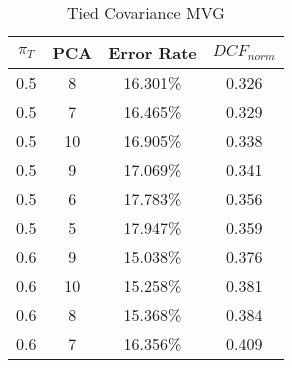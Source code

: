 \begin{center}
\begin{longtable}{|c|c|c|c|}
\caption{Tied Covariance MVG}\label{tab:mvg_tiedcov}\\
\hline
$\pi_T$ & PCA & Error Rate & $DCF_{norm}$\\
\hline
0.5 & 8 & 16.301\% & 0.326\\
\hline
0.5 & 7 & 16.465\% & 0.329\\
\hline
0.5 & 10 & 16.905\% & 0.338\\
\hline
0.5 & 9 & 17.069\% & 0.341\\
\hline
0.5 & 6 & 17.783\% & 0.356\\
\hline
0.5 & 5 & 17.947\% & 0.359\\
\hline
0.6 & 9 & 15.038\% & 0.376\\
\hline
0.6 & 10 & 15.258\% & 0.381\\
\hline
0.6 & 8 & 15.368\% & 0.384\\
\hline
0.6 & 7 & 16.356\% & 0.409\\
\hline
\hline
\end{longtable}
\end{center}
